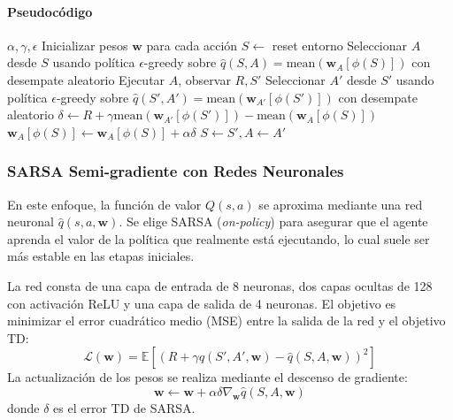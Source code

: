 \paragraph{Pseudocódigo}\mbox{}
\begin{algorithm}[H]
\caption{SARSA Semi-gradiente con Tile Coding para LunarLander-v3}
\begin{algorithmic}[1]
\small
\Require $\alpha, \gamma, \epsilon$
\State Inicializar pesos $\mathbf{w}$ para cada acción
\State $S \gets$ reset entorno
\State Seleccionar $A$ desde $S$ usando política $\epsilon$-greedy sobre $\hat{q}(S, A) = \text{mean}(\mathbf{w}_A[\phi(S)])$ con desempate aleatorio
\State Ejecutar $A$, observar $R, S'$
\State Seleccionar $A'$ desde $S'$ usando política $\epsilon$-greedy sobre $\hat{q}(S', A') = \text{mean}(\mathbf{w}_{A'}[\phi(S')])$ con desempate aleatorio
\State $\delta \gets R + \gamma \text{mean}(\mathbf{w}_{A'}[\phi(S')]) - \text{mean}(\mathbf{w}_A[\phi(S)])$
\State $\mathbf{w}_A[\phi(S)] \gets \mathbf{w}_A[\phi(S)] + \alpha \delta$
\State $S \gets S', A \gets A'$
\EndFor
\end{algorithmic}
\end{algorithm}

\subsubsection{SARSA Semi-gradiente con Redes Neuronales}

En este enfoque, la función de valor $Q(s, a)$ se aproxima mediante una red neuronal $\hat{q}(s, a, \mathbf{w})$. Se elige SARSA (\textit{on-policy}) para asegurar que el agente aprenda el valor de la política que realmente está ejecutando, lo cual suele ser más estable en las etapas iniciales.

La red consta de una capa de entrada de 8 neuronas, dos capas ocultas de 128 con activación ReLU y una capa de salida de 4 neuronas. El objetivo es minimizar el error cuadrático medio (MSE) entre la salida de la red y el objetivo TD:
$$
\mathcal{L}(\mathbf{w}) = \mathbb{E} \left[ \left( R + \gamma \hat{q}(S', A', \mathbf{w}) - \hat{q}(S, A, \mathbf{w}) \right)^2 \right]
$$ 
La actualización de los pesos se realiza mediante el descenso de gradiente:
$$
\mathbf{w} \leftarrow \mathbf{w} + \alpha \delta \nabla_{\mathbf{w}} \hat{q}(S, A, \mathbf{w})
$$
donde $\delta$ es el error TD de SARSA. 


